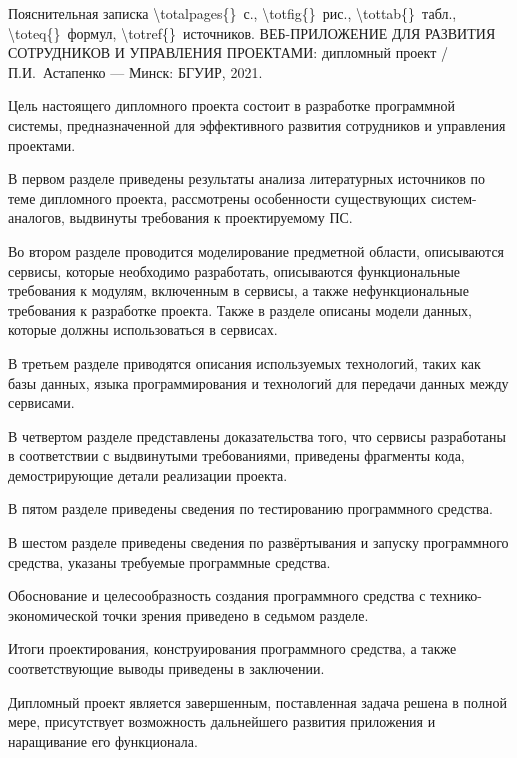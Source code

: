 \thispagestyle{empty}

\setcounter{page}{7}


\begin{center}
    Пояснительная записка \num{\totalpages{}}~с., \num{\totfig{}}~рис., \num{\tottab{}}~табл., \num{\toteq{}}~формул, \num{\totref{}}~источников.
	\MakeUppercase{Веб-приложение для развития сотрудников и управления проектами}: дипломный проект / П.И.~Астапенко — Минск: БГУИР, 2021.
\end{center}

Цель настоящего дипломного проекта состоит в разработке программной системы, предназначенной для эффективного развития сотрудников и управления проектами.

В первом разделе приведены результаты анализа литературных источников по теме дипломного проекта, рассмотрены особенности существующих систем-ана\-логов, выдвинуты требования к проектируемому ПС. 

Во втором разделе проводится моделирование предметной области, описываются сервисы, которые необходимо разработать, описываются функциональные требования к модулям, включенным в сервисы, а также нефункциональные требования к разработке проекта. Также в разделе описаны модели данных, которые должны использоваться в сервисах. 

В третьем разделе приводятся описания используемых технологий, таких как базы данных, языка программирования и технологий для передачи данных между сервисами. 

В четвертом разделе представлены доказательства того, что сервисы разработаны в соответствии с выдвинутыми требованиями, приведены фрагменты кода, демострирующие детали реализации проекта. 

В пятом разделе приведены сведения по тестированию программного средства.

В шестом разделе приведены сведения по развёртывания и запуску программного средства, указаны требуемые программные средства.

Обоснование и целесообразность создания программного средства с технико-экономической точки зрения приведено в седьмом разделе. 

Итоги проектирования, конструирования программного средства, а также соответствующие выводы приведены в заключении.

Дипломный проект является завершенным, поставленная задача решена в полной мере, присутствует возможность дальнейшего развития приложения и наращивание его функционала.
